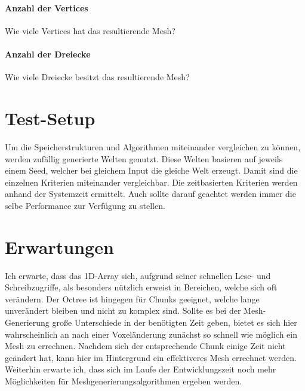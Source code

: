 \documentclass[
a4paper,     %
12pt         %
]{scrartcl}  %
\begin{document}
\paragraph{Anzahl der Vertices}
Wie viele Vertices hat das resultierende Mesh?

\paragraph{Anzahl der Dreiecke}
Wie viele Dreiecke besitzt das resultierende Mesh?

\section{Test-Setup}
Um die Speicherstrukturen und Algorithmen miteinander vergleichen zu können, werden zufällig generierte Welten genutzt. Diese Welten basieren auf jeweils einem Seed, welcher bei gleichem Input die gleiche Welt erzeugt. Damit sind die einzelnen Kriterien miteinander vergleichbar. Die zeitbasierten Kriterien werden anhand der Systemzeit ermittelt. Auch sollte darauf geachtet werden immer die selbe Performance zur Verfügung zu stellen.

\section{Erwartungen}
Ich erwarte, dass das 1D-Array sich, aufgrund seiner schnellen Lese- und Schreibzugriffe, als besonders nützlich erweist in Bereichen, welche sich oft verändern. Der Octree ist hingegen für Chunks geeignet, welche lange unverändert bleiben und nicht zu komplex sind. Sollte es bei der Mesh-Generierung große Unterschiede in der benötigten Zeit geben, bietet es sich hier wahrscheinlich an nach einer Voxeländerung zunächst so schnell wie möglich ein Mesh zu errechnen. Nachdem sich der entsprechende Chunk einige Zeit nicht geändert hat, kann hier im Hintergrund ein effektiveres Mesh errechnet werden.
Weiterhin erwarte ich, dass sich im Laufe der Entwicklungszeit noch mehr Möglichkeiten für Meshgenerierungsalgorithmen ergeben werden.




% 

% 
\end{document}
